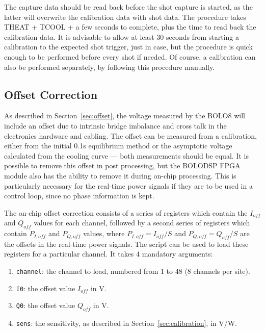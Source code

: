 \documentclass[12pt,a4paper]{article}
\begin{document}
The capture data should be read back before the shot capture is started, as the latter will overwrite the calibration data with shot data. The procedure
takes THEAT + TCOOL + a few seconds to complete, plus the time to read back the calibration data. It is advisable to allow at least 30 seconds from
starting a calibration to the expected shot trigger, just in case, but the procedure is quick enough to be performed before every shot if needed. Of
course, a calibration can also be performed separately, by following this procedure manually.

\subsection{Offset Correction}
\label{sec:offset_correction}
As described in Section~\ref{sec:offset}, the voltage measured by the BOLO8 will include an offset due to intrinsic bridge imbalance and cross talk in the
electronics hardware and cabling. The offset can be measured from a calibration, either from the initial 0.1s equilibrium method or the asymptotic voltage
calculated from the cooling curve --- both measurements should be equal. It is possible to remove this offset in post processing, but the BOLODSP FPGA
module also has the ability to remove it during on-chip processing. This is particularly necessary for the real-time power signals if they are to be used
in a control loop, since no phase information is kept.

The on-chip offset correction consists of a series of registers which contain the $I_{off}$ and $Q_{off}$ values for each channel, followed by a second
series of registers which contain $P_{I,off}$ and $P_{Q,off}$ values, where $P_{I,off} = I_{off}/S$ and $P_{Q,off} = Q_{off}/S$ are the offsets in the
real-time power signals. The script \mbox{} can be used to load these registers for a particular channel. It
takes 4 mandatory arguments:
\begin{enumerate}
\item{\texttt{channel}: the channel to load, numbered from 1 to 48 (8 channels per site).}
\item{\texttt{I0}: the offset value $I_{off}$ in V.}
\item{\texttt{Q0}: the offset value $Q_{off}$ in V.}
\item{\texttt{sens}: the sensitivity, as described in Section~\ref{sec:calibration}, in V/W.}
\end{enumerate}
\end{document}
